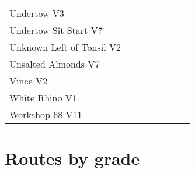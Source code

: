 \begin{center}
\begin{supertabular}{p{0.65\linewidth}r}
Undertow V3 & \pageref{rt:Undertow} \\
Undertow Sit Start V7 & \pageref{vr:Undertow Sit Start} \\
Unknown Left of Tonsil V2 & \pageref{rt:Unknown Left of Tonsil} \\
Unsalted Almonds V7 & \pageref{rt:Unsalted Almonds} \\
Vince V2 & \pageref{rt:Vince} \\
White Rhino V1 & \pageref{rt:White Rhino} \\
Workshop 68 V11 & \pageref{rt:Workshop 68} \\
\end{supertabular}
\end{center}
\section{Routes by grade}
